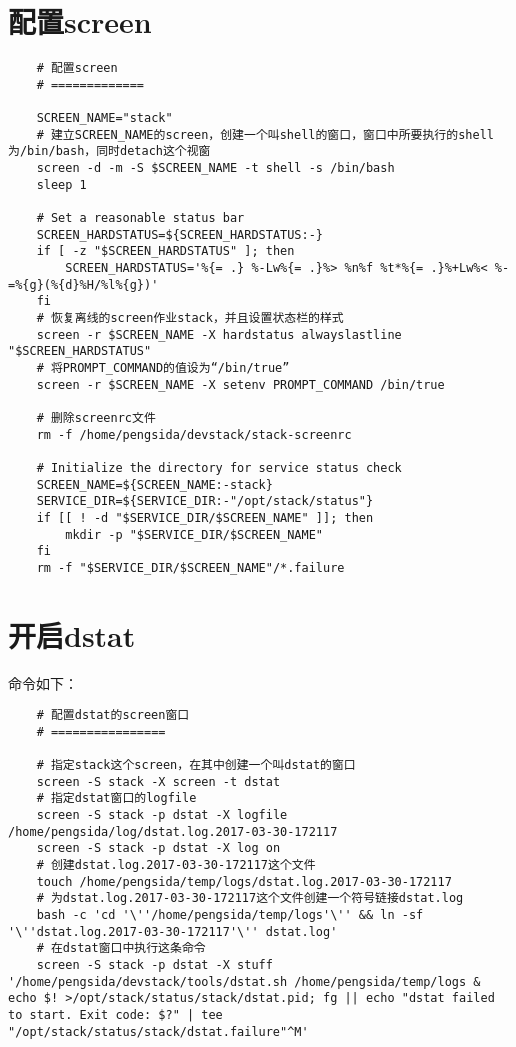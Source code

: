 \documentclass[a4paper,left=1.5cm,right=1.5cm,11pt]{article}
\begin{document}
\tableofcontents

\clearpage

\section{配置screen}
	\begin{lstlisting}
	# 配置screen
	# =============
	
	SCREEN_NAME="stack"
	# 建立SCREEN_NAME的screen，创建一个叫shell的窗口，窗口中所要执行的shell为/bin/bash，同时detach这个视窗
	screen -d -m -S $SCREEN_NAME -t shell -s /bin/bash
    sleep 1

    # Set a reasonable status bar
    SCREEN_HARDSTATUS=${SCREEN_HARDSTATUS:-}
    if [ -z "$SCREEN_HARDSTATUS" ]; then
        SCREEN_HARDSTATUS='%{= .} %-Lw%{= .}%> %n%f %t*%{= .}%+Lw%< %-=%{g}(%{d}%H/%l%{g})'
    fi
	# 恢复离线的screen作业stack，并且设置状态栏的样式
    screen -r $SCREEN_NAME -X hardstatus alwayslastline "$SCREEN_HARDSTATUS"
	# 将PROMPT_COMMAND的值设为“/bin/true”
    screen -r $SCREEN_NAME -X setenv PROMPT_COMMAND /bin/true

	# 删除screenrc文件
	rm -f /home/pengsida/devstack/stack-screenrc

	# Initialize the directory for service status check
	SCREEN_NAME=${SCREEN_NAME:-stack}
    SERVICE_DIR=${SERVICE_DIR:-"/opt/stack/status"}
    if [[ ! -d "$SERVICE_DIR/$SCREEN_NAME" ]]; then
        mkdir -p "$SERVICE_DIR/$SCREEN_NAME"
    fi
    rm -f "$SERVICE_DIR/$SCREEN_NAME"/*.failure
	\end{lstlisting}

\section{开启dstat}
	命令如下：
	\begin{lstlisting}
	# 配置dstat的screen窗口
	# ================

	# 指定stack这个screen，在其中创建一个叫dstat的窗口
	screen -S stack -X screen -t dstat
	# 指定dstat窗口的logfile
	screen -S stack -p dstat -X logfile /home/pengsida/log/dstat.log.2017-03-30-172117
	screen -S stack -p dstat -X log on
	# 创建dstat.log.2017-03-30-172117这个文件
	touch /home/pengsida/temp/logs/dstat.log.2017-03-30-172117
	# 为dstat.log.2017-03-30-172117这个文件创建一个符号链接dstat.log
	bash -c 'cd '\''/home/pengsida/temp/logs'\'' && ln -sf '\''dstat.log.2017-03-30-172117'\'' dstat.log'
	# 在dstat窗口中执行这条命令
	screen -S stack -p dstat -X stuff '/home/pengsida/devstack/tools/dstat.sh /home/pengsida/temp/logs & echo $! >/opt/stack/status/stack/dstat.pid; fg || echo "dstat failed to start. Exit code: $?" | tee "/opt/stack/status/stack/dstat.failure"^M'
	\end{lstlisting}
\end{document}
